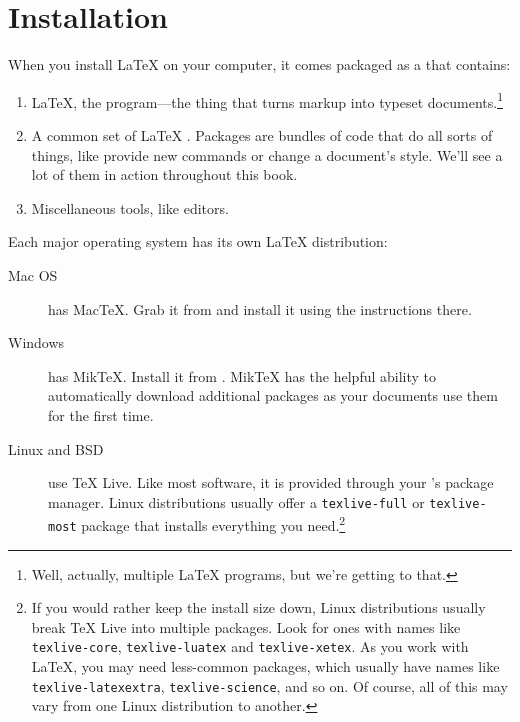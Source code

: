 \chapter{Installation}
\label{installation}

When you install \LaTeX{} on your computer, it comes packaged as a
 that contains:
\begin{enumerate}
\item \LaTeX, the program---the thing that turns markup into
    typeset documents.\footnote{Well, actually, multiple \LaTeX{} programs,
    but we're getting to that.}
\item A common set of \LaTeX{} .
    Packages are bundles of code that do all sorts of things,
    like provide new commands or change a document's style.
    We'll see a lot of them in action throughout this book.
\item Miscellaneous tools, like editors.
\end{enumerate}
Each major operating system has its own \LaTeX{} distribution:
\begin{description}
\item[Mac OS] has Mac\TeX. Grab it from 
    and install it using the instructions there.

\item[Windows] has Mik\TeX.
    Install it from .
    Mik\TeX{} has the helpful ability to automatically download
    additional packages as your documents use them for the first time.

\item[Linux and BSD] use \TeX{} Live.
    Like most software, it is provided through your
    's package manager.
    Linux distributions usually offer a \texttt{texlive-\allowbreak full}
    or \texttt{texlive-\allowbreak most} package that installs everything
    you need.\punckern\footnote{%
    If you would rather keep the install size down,
    Linux distributions usually break \TeX{} Live into multiple packages.
    Look for ones with names like
    \texttt{texlive-\allowbreak core}, \texttt{texlive-\allowbreak luatex}
    and \texttt{texlive-\allowbreak xetex}.
    As you work with \LaTeX, you may need less-common packages,
    which usually have names like \texttt{texlive-\allowbreak latexextra},
    \texttt{texlive-\allowbreak science}, and so on.
    Of course, all of this may vary from one Linux distribution to another.}
\end{description}

